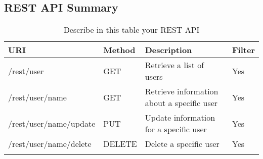 \subsection{REST API Summary}


\begin{longtable}{|p{}|p{} |p{}|p{}|} 
\hline
\textbf{URI} & \textbf{Method} & \textbf{Description} & \textbf{Filter} \\\hline
/rest/user & GET & Retrieve a list of users & Yes \\\hline
/rest/user/name & GET & Retrieve information about a specific user & Yes \\\hline
/rest/user/name/update & PUT & Update information for a specific user & Yes \\\hline
/rest/user/name/delete & DELETE & Delete a specific user & Yes \\\hline
\caption{Describe in this table your REST API}
\label{tab:termGlossary}
\end{longtable}